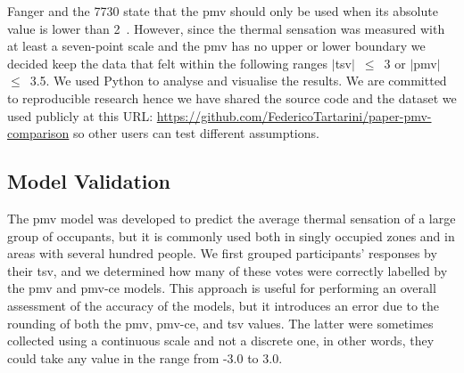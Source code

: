 Fanger and the \gls{7730} state that the \ac{pmv} should only be used when its absolute value is lower than 2~\cite{Fanger1970, iso7730}.
However, since the thermal sensation was measured with at least a seven-point scale and the \ac{pmv} has no upper or lower boundary we decided keep the data that felt within the following ranges $|$\ac{tsv}$|$~$\leq$~\num{3} or $|$\ac{pmv}$|$~$\leq$~\num{3.5}.
We used Python to analyse and visualise the results.
We are committed to reproducible research hence we have shared the source code and the dataset we used publicly at this URL: \url{https://github.com/FedericoTartarini/paper-pmv-comparison} so other users can test different assumptions.

\subsection{Model Validation}\label{subsec:model-validation}
The \ac{pmv} model was developed to predict the average thermal sensation of a large group of occupants, but it is commonly used both in singly occupied zones and in areas with several hundred people.
We first grouped participants' responses by their \ac{tsv}, and we determined how many of these votes were correctly labelled by the \ac{pmv} and \ac{pmv-ce} models.
This approach is useful for performing an overall assessment of the accuracy of the models, but it introduces an error due to the rounding of both the \ac{pmv}, \ac{pmv-ce}, and \ac{tsv} values.
The latter were sometimes collected using a continuous scale and not a discrete one, in other words, they could take any value in the range from -3.0 to 3.0.

